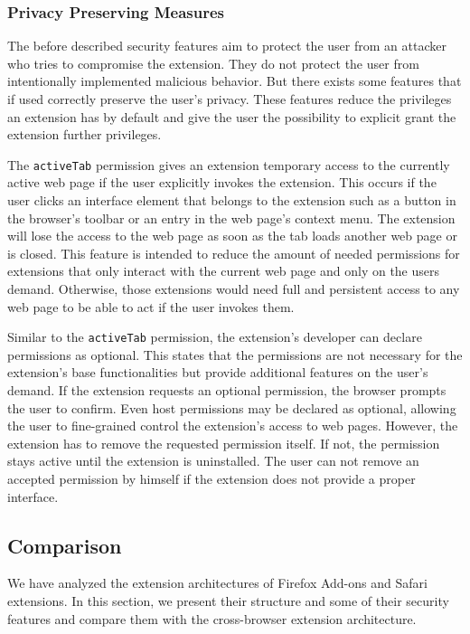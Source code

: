 \subsubsection{Privacy Preserving Measures}

	The before described security features aim to protect the user from an attacker who tries to compromise the extension. They do not protect the user from intentionally implemented malicious behavior. But there exists some features that if used correctly preserve the user's privacy. These features reduce the privileges an extension has by default and give the user the possibility to explicit grant the extension further privileges. 
	
	The \texttt{activeTab} permission gives an extension temporary access to the currently active web page if the user explicitly invokes the extension. This occurs if the user clicks an interface element that belongs to the extension such as a button in the browser's toolbar or an entry in the web page's context menu. The extension will lose the access to the web page as soon as the tab loads another web page or is closed. This feature is intended to reduce the amount of needed permissions for extensions that only interact with the current web page and only on the users demand. Otherwise, those extensions would need full and persistent access to any web page to be able to act if the user invokes them.
	
	Similar to the \texttt{activeTab} permission, the extension's developer can declare permissions as optional. This states that the permissions are not necessary for the extension's base functionalities but provide additional features on the user's demand. If the extension requests an optional permission, the browser prompts the user to confirm. Even host permissions may be declared as optional, allowing the user to fine-grained control the extension's access to web pages. However, the extension has to remove the requested permission itself. If not, the permission stays active until the extension is uninstalled. The user can not remove an accepted permission by himself if the extension does not provide a proper interface. 

\subsection{Comparison}
	
	We have analyzed the extension architectures of Firefox Add-ons and Safari extensions. In this section, we present their structure and some of their security features and compare them with the cross-browser extension architecture.

